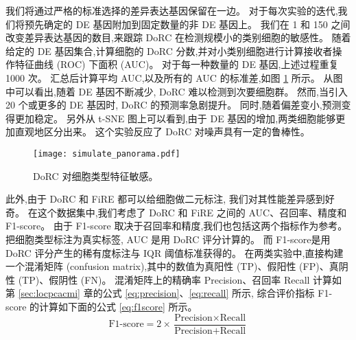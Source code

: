 我们将通过严格的标准选择的差异表达基因保留在一边。
对于每次实验的迭代,我们将预先确定的 DE 基因附加到固定数量的非 DE 基因上。
我们在 1 和 150 之间改变差异表达基因的数目,来跟踪 DoRC 在检测规模小的类别细胞的敏感性。
随着给定的 DE 基因集合,计算细胞的 DoRC 分数,并对小类别细胞进行计算接收者操作特征曲线 (ROC) 下面积 (AUC)。
对于每一种数量的 DE 基因,上述过程重复 1000 次。
汇总后计算平均 AUC,以及所有的 AUC 的标准差,如图 \ref{fig:simulate:roc} 所示。
从图中可以看出,随着 DE 基因不断减少, DoRC 难以检测到次要细胞群。
然而,当引入 20 个或更多的 DE 基因时, DoRC 的预测率急剧提升。
同时,随着偏差变小,预测变得更加稳定。
另外从 t-SNE 图上可以看到,由于 DE 基因的增加,两类细胞能够更加直观地区分出来。
这个实验反应了 DoRC 对噪声具有一定的鲁棒性。

\begin{figure}[!htbp]
    \centering
    \texttt{[image: simulate\_panorama.pdf]}
    \caption{
    DoRC 对细胞类型特征敏感。
    }
    \label{fig:simulate:roc}
\end{figure}

此外,由于 DoRC 和 FiRE 都可以给细胞做二元标注,
我们对其性能差异感到好奇。
在这个数据集中,我们考虑了 DoRC 和 FiRE 之间的 AUC、召回率、精度和 F1-score。
由于 F1-score 取决于召回率和精度,我们也包括这两个指标作为参考。
把细胞类型标注为真实标签, AUC 是用 DoRC 评分计算的。
而 F1-score是用 DoRC 评分产生的稀有度标注与 IQR 阈值标准获得的。
在两类实验中,直接构建一个混淆矩阵 (confusion matrix),其中的数值为真阳性 (TP)、假阳性 (FP)、真阴性 (TP)、假阴性 (FN)。
混淆矩阵上的精确率 Precision、召回率 Recall 计算如第 \ref{sec:locpcacmi} 章的公式 \ref{eq:precision}、\ref{eq:recall} 所示,
综合评价指标 F1-score 的计算如下面的公式 \ref{eq:f1score} 所示。
\begin{equation}
\label{eq:f1score}
\text{F1-score} = 2 \times \frac{\text{Precision} \times \text{Recall}}{ \text{Precision} + \text{Recall}}
\end{equation}

